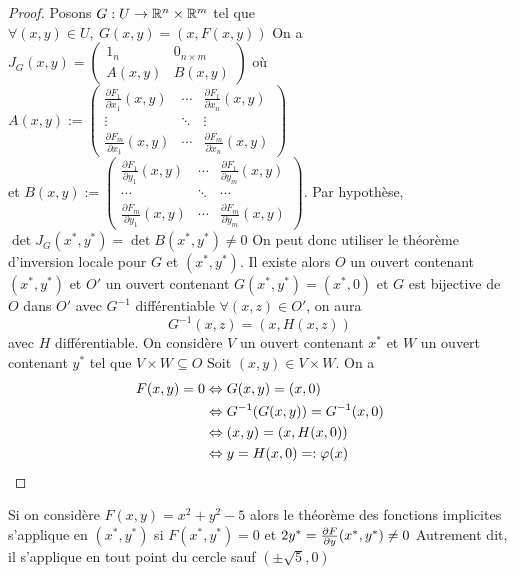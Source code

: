 \begin{proof}
    Posons $G : U\to\mathbb{R}^n\times \mathbb{R}^m$ tel que $\forall(x,y)\in U,\ G(x,y) = (x,F(x,y))$
    On a $J_G(x,y) = \begin{pmatrix}
        1_n & 0_{n\times m}\\
        A(x,y)&B(x,y)
    \end{pmatrix}$ où $A(x,y):=\begin{pmatrix}
     \frac{\partial F_1}{\partial x_1}(x,y) & \cdots & \frac{\partial F_1}{\partial x_n}(x,y) \\
    \vdots & \ddots& \vdots \\
    \frac{\partial F_m}{\partial x_1}(x,y) & \cdots & \frac{\partial F_m}{\partial x_n}(x,y)   
    \end{pmatrix}$ \\et $B(x,y):=\begin{pmatrix}
        \frac{\partial F_1}{\partial y_1}(x,y) & \cdots & \frac{\partial F_1}{\partial y _m}(x,y) \\
    \cdots & \ddots& \cdots \\
    \frac{\partial F_m}{\partial y_1}(x,y) & \cdots & \frac{\partial F_m}{\partial y_m}(x,y)
    \end{pmatrix}$.
    Par hypothèse, $\det J_G(x^*,y^*) =  \det B(x^*,y^*)\ne 0$
    On peut donc utiliser le théorème d’inversion locale pour $G$ et $(x^*,y^*)$.
    Il existe alors $O$ un ouvert contenant $(x^*,y^*)$ et $O'$ un ouvert contenant 
    $G(x^*,y^*) = (x^*,0)$ et $G$ est bijective de $O$ dans $O'$ avec $G^{-1}$ différentiable 
    $\forall (x,z) \in O'$, on aura 
    $$ G^{-1} (x,z) = (x,H(x,z))$$ avec $H$ différentiable. 
    On considère $V$ un ouvert contenant $x^*$ et $W$ un ouvert contenant $y^*$ tel que $V\times W \subseteq O$
    Soit $(x,y)\in V\times W$. On a \begin{align*}
        F(x,y) = 0 &\Leftrightarrow G(x,y)=(x,0)\\
        &\Leftrightarrow G^{-1}(G(x,y)) = G^{-1}(x,0)\\
        &\Leftrightarrow(x,y) = (x,H(x,0))\\
        &\Leftrightarrow y = H(x,0)=:\varphi(x)
    \end{align*}
\end{proof}

\begin{exemple}
    Si on considère $F(x,y) = x^2 + y^2 - 5$ alors le théorème des fonctions implicites s'applique en $(x^*,y^*)$ si $F(x^*,y^*) = 0$ et $2 y^*=\frac{\partial F}{\partial y}(x^*,y^*)\ne 0$ 
    Autrement dit, il s'applique en tout point du cercle sauf $(\pm \sqrt5,0)$
\end{exemple}
